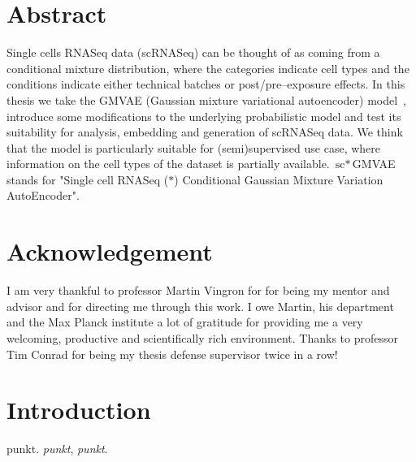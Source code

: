 \documentclass[11pt, a4paper]{report}
\theoremstyle{plain}
\theoremstyle{definition}
\theoremstyle{remark}
\begin{document}



\chapter*{Abstract}
Single cells RNASeq data (scRNASeq) can be thought of as coming from a conditional mixture distribution, where
the categories indicate cell types and the conditions indicate either technical
batches or post/pre--exposure effects.
In this thesis we take the GMVAE (Gaussian mixture variational autoencoder) model~\cite{dilokthanakul2016deep},
introduce some modifications to the underlying probabilistic model
and test its suitability for analysis, embedding and generation of scRNASeq
data.
We think that the model is particularly suitable for (semi)supervised use case,
where information on the cell types of the dataset is partially available.
$\text{sc}{\ast}$GMVAE stands for 
"Single cell RNASeq ($\ast$) Conditional Gaussian Mixture Variation
AutoEncoder".


\chapter*{Acknowledgement}

I am very thankful to
professor Martin Vingron for 
for being my mentor and advisor and for directing me through this work. 
I owe Martin, his department and the Max Planck institute  a lot of gratitude
for providing me a very welcoming, productive and scientifically rich
environment.
Thanks to professor Tim Conrad for being my thesis defense supervisor twice in a
row!



\listoffigures

\tableofcontents

\chapter{Introduction} punkt. \emph{punkt}, \textit{punkt}.
\end{document}
